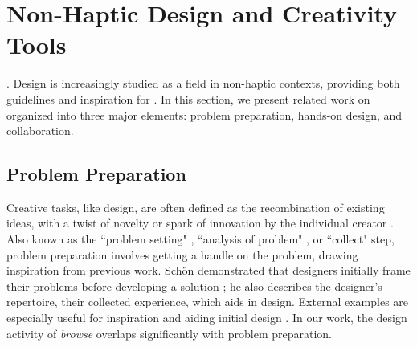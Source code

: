 


%
%
\section{Non-Haptic Design and Creativity Tools}
.
Design is increasingly studied as a field in non-haptic contexts, providing both guidelines and inspiration for \haxd.
In this section, we present related work on  organized into three major elements: problem preparation, hands-on design, and collaboration.

\subsection{Problem Preparation}
Creative tasks, like design, are often defined as the recombination of existing ideas, with a twist of novelty or spark of innovation by the individual creator \cite{Warr2005}.
Also known as the ``problem setting" \cite{Schon1982}, ``analysis of problem" \cite{Warr2005}, or ``collect" \cite{Shneiderman2000} step, problem preparation involves getting a handle on the problem,  drawing inspiration from previous work. %
Sch\"{o}n demonstrated that designers initially frame their problems before developing a solution \cite{Schon1982};
he also describes the designer's repertoire, their collected experience, which aids in design.
External examples are especially useful for inspiration and aiding initial design \cite{Herring2009,Buxton2007}. 
In our work, the design activity of \emph{browse} overlaps significantly with problem preparation.

